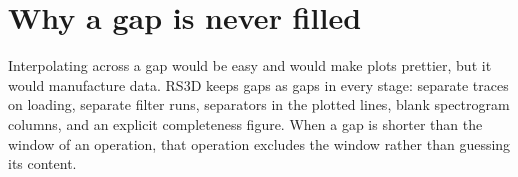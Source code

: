 \section{Why a gap is never filled}
Interpolating across a gap would be easy and would make plots prettier, but it would manufacture data. RS3D keeps gaps as
gaps in every stage: separate traces on loading, separate filter runs,  separators in the plotted lines, blank
spectrogram columns, and an explicit completeness figure. When a gap is shorter than the window of an operation, that
operation excludes the window rather than guessing its content.
